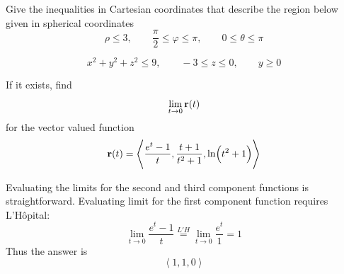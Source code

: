 \documentclass[12pt,answers]{exam}
\newcommand{\vect}[1]{\left\langle #1\right\rangle}
\newcommand{\vbr}{\vb{r}}
\begin{document}
\begin{questions}

\newpage
\question[10] Give the inequalities in Cartesian coordinates that describe the region below given in spherical coordinates
\[
  \rho \le 3, \qquad \frac\pi2 \le \varphi \le \pi, \qquad 0 \le \theta \le \pi
\]
\begin{solution}
  \[
    x^2 + y^2 + z^2 \le 9, \qquad -3 \le z \le 0, \qquad y\ge0
  \]
\end{solution}

\question[10] If it exists, find
\[\lim_{t\to0} \vbr(t)\]
for the vector valued function
\[\vbr(t) = \vect{\frac{e^t-1}{t}, \frac{t+1}{t^2+1}, \ln(t^2+1)} \]
\begin{solution}
  Evaluating the limits for the second and third component functions is straightforward. 
  Evaluating limit for the first component function requires L'H\^{o}pital:
  \[
    \lim_{t\to0} \frac{e^t-1}{t} \overset{L'H}{=} \lim_{t\to0}\frac{e^t}{1} = 1
  \]
  Thus the answer is
  \[
    \boxed{\vect{1,1,0}}
  \]
\end{solution}

\end{questions}
\end{document}
